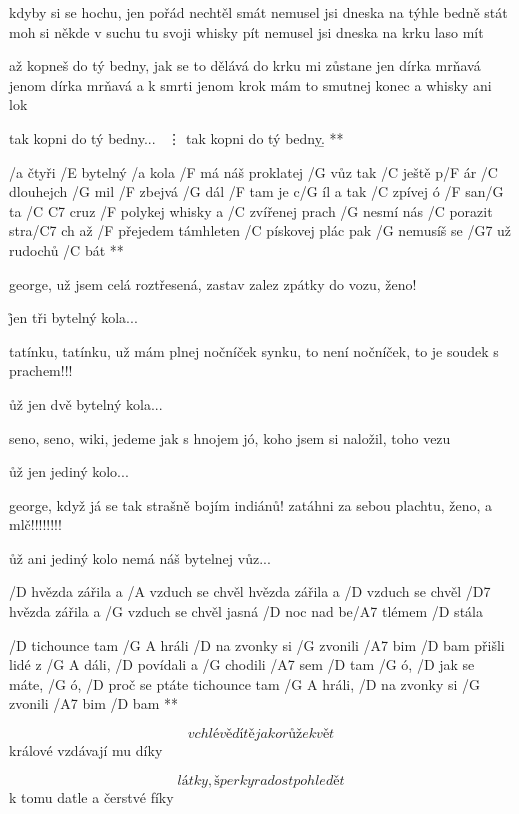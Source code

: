 kdyby si se hochu, jen pořád nechtěl smát
nemusel jsi dneska na týhle bedně stát
moh si někde v suchu tu svoji whisky pít
nemusel jsi dneska na krku laso mít \s

až kopneš do tý bedny, jak se to dělává
do krku mi zůstane jen dírka mrňavá
jenom dírka mrňavá a k smrti jenom krok
mám to smutnej konec a whisky ani lok

\R tak kopni do tý bedny...
   \ \vdots
   tak kopni do tý bedny{\b . \dag} **




\R /a čtyři /E bytelný /a kola /F má náš proklatej /G vůz
   tak /C ještě p/F ár /C dlouhejch /G mil /F zbejvá /G dál
   /F tam je c/G íl
   a tak /C zpívej ó /F san/G ta /{C C7} cruz
   /F polykej whisky a /C zvířenej prach
   /G nesmí nás /C porazit stra/C7 ch
   až /F přejedem támhleten /C pískovej plác
   pak /G nemusíš se /G7 už rudochů /C bát **

george, už jsem celá roztřesená, zastav
zalez zpátky do vozu, ženo!

\r jen tři bytelný kola...

tatínku, tatínku, už mám plnej nočníček
synku, to není nočníček, to je soudek s prachem!!!

\r už jen dvě bytelný kola...

seno, seno, wiki, jedeme jak s hnojem
jó, koho jsem si naložil, toho vezu

\r už jen jediný kolo...

george, když já se tak strašně bojím indiánů!
zatáhni za sebou plachtu, ženo, a mlč!!!!!!!!

\r už ani jediný kolo nemá náš bytelnej vůz...




/D hvězda zářila a /A vzduch se chvěl
hvězda zářila a /D vzduch se chvěl
/D7 hvězda zářila a /G vzduch se chvěl
jasná /D noc nad be/A7 tlémem /D stála

\R /D tichounce tam /{G A} hráli
  /D na zvonky si /G zvonili /A7 bim /D bam
   přišli lidé z /{G A} dáli, /D povídali a /G chodili /A7 sem /D tam
   /G ó, /D jak se máte, /G ó, /D proč se ptáte
   tichounce tam /{G A} hráli, /D na zvonky si /G zvonili /A7 bim /D bam **

\[ v chlévě dítě jako růže květ \]
králové vzdávají mu díky \s

\[ látky, šperky radost pohledět \]
k tomu datle a čerstvé fíky

